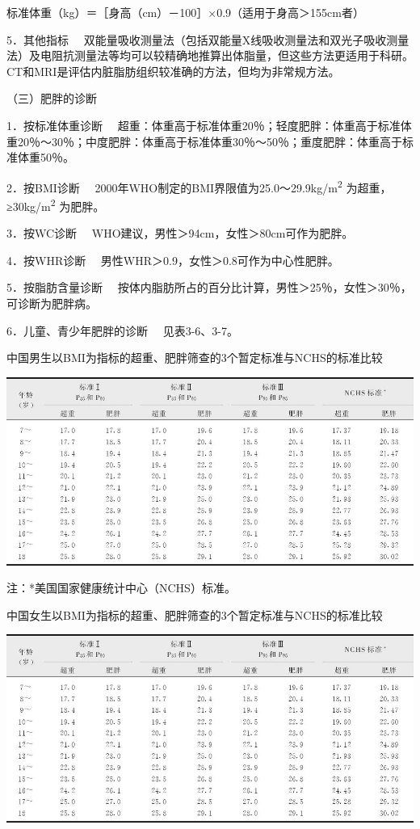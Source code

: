 标准体重（kg）＝［身高（cm）－100］×0.9（适用于身高＞155cm者）

{5．其他指标}
　双能量吸收测量法（包括双能量X线吸收测量法和双光子吸收测量法）及电阻抗测量法等均可以较精确地推算出体脂量，但这些方法更适用于科研。CT和MRI是评估内脏脂肪组织较准确的方法，但均为非常规方法。

（三）肥胖的诊断

{1．按标准体重诊断}
　超重：体重高于标准体重20％；轻度肥胖：体重高于标准体重20％～30％；中度肥胖：体重高于标准体重30％～50％；重度肥胖：体重高于标准体重50％。

{2．按BMI诊断}
　2000年WHO制定的BMI界限值为25.0～29.9kg/m\textsuperscript{2}
为超重，≥30kg/m\textsuperscript{2} 为肥胖。

{3．按WC诊断} 　WHO建议，男性＞94cm，女性＞80cm可作为肥胖。

{4．按WHR诊断} 　男性WHR＞0.9，女性＞0.8可作为中心性肥胖。

{5．按脂肪含量诊断}
　按体内脂肪所占的百分比计算，男性＞25％，女性＞30％，可诊断为肥胖病。

{6．儿童、青少年肥胖的诊断} 　见表3-6、3-7。

\begin{table}[htbp]
\centering
\caption{中国男生以BMI为指标的超重、肥胖筛查的3个暂定标准与NCHS的标准比较}
\label{tab3-6}
\includegraphics{./images/Image00021.jpg}
\end{table}

注：*美国国家健康统计中心（NCHS）标准。

\begin{table}[htbp]
\centering
\caption{中国女生以BMI为指标的超重、肥胖筛查的3个暂定标准与NCHS的标准比较}
\label{tab3-7}
\includegraphics{./images/Image00022.jpg}
\end{table}

